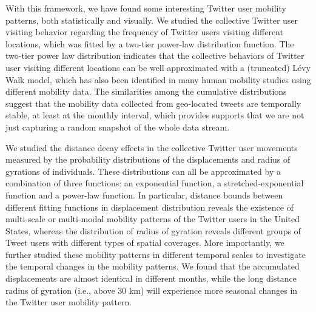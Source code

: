 \documentclass[a4paper, 11pt]{article}
\begin{document}
With this framework, we have found some interesting Twitter user mobility patterns, both statistically and visually.
We studied the collective Twitter user visiting behavior regarding the frequency of Twitter users visiting different locations, which was fitted by a two-tier power-law distribution function.
The two-tier power law distribution indicates that the collective behaviors of Twitter user visiting different locations can be well approximated with a (truncated) L\'{e}vy Walk model, which has also been identified in many human mobility studies using different mobility data.
The similarities among the cumulative distributions suggest that the mobility data collected from geo-located tweets are temporally stable, at least at the monthly interval, which provides supports that we are not just capturing a random snapshot of the whole data stream. 

We studied the distance decay effects in the collective Twitter user movements measured by the probability distributions of the displacements and radius of gyrations of individuals. 
These distributions can all be approximated by a combination of three functions: an exponential function, a stretched-exponential function and a power-law function. In particular, distance bounds between different fitting functions in displacement distribution reveals the existence of multi-scale or multi-modal mobility patterns of the Twitter users in the United States, whereas the distribution of radius of gyration reveals different groups of Tweet users with different types of spatial coverages.   
More importantly, we further studied these mobility patterns in different temporal scales to investigate the temporal changes in the mobility patterns. 
We found that the accumulated displacements are almost identical in different months, while the long distance radius of gyration (i.e., above 30 km) will experience more seasonal changes in the Twitter user mobility pattern.



\cleardoublepage
%



\end{document}
